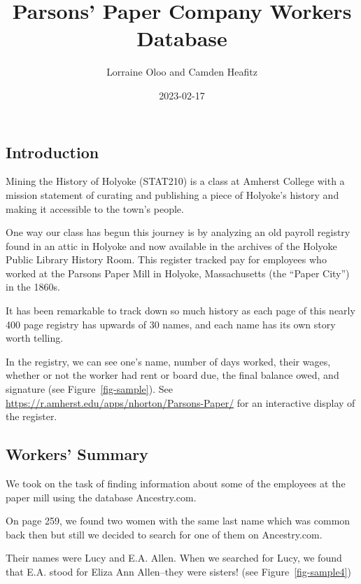 \documentclass[
  letterpaper,
  DIV=11,
  numbers=noendperiod]{scrartcl}
\title{Parsons' Paper Company Workers Database}
\author{Lorraine Oloo and Camden Heafitz}
\date{2023-02-17}
\begin{document}
\maketitle
\ifdefined\Shaded\renewenvironment{Shaded}{\begin{tcolorbox}[boxrule=0pt, frame hidden, sharp corners, borderline west={3pt}{0pt}{shadecolor}, enhanced, breakable, interior hidden]}{\end{tcolorbox}}\fi

\hypertarget{introduction}{%
\subsection{Introduction}\label{introduction}}

Mining the History of Holyoke (STAT210) is a class at Amherst College
with a mission statement of curating and publishing a piece of Holyoke's
history and making it accessible to the town's people.

One way our class has begun this journey is by analyzing an old payroll
registry found in an attic in Holyoke and now available in the archives
of the Holyoke Public Library History Room. This register tracked pay
for employees who worked at the Parsons Paper Mill in Holyoke,
Massachusetts (the ``Paper City'') in the 1860s.

It has been remarkable to track down so much history as each page of
this nearly 400 page registry has upwards of 30 names, and each name has
its own story worth telling.

In the registry, we can see one's name, number of days worked, their
wages, whether or not the worker had rent or board due, the final
balance owed, and signature (see Figure~\ref{fig-sample}). See
\url{https://r.amherst.edu/apps/nhorton/Parsons-Paper/} for an
interactive display of the register.

\hypertarget{workers-summary}{%
\subsection{Workers' Summary}\label{workers-summary}}

We took on the task of finding information about some of the employees
at the paper mill using the database Ancestry.com.

On page 259, we found two women with the same last name which was common
back then but still we decided to search for one of them on
Ancestry.com.

Their names were Lucy and E.A. Allen. When we searched for Lucy, we
found that E.A. stood for Eliza Ann Allen--they were sisters! (see
Figure~\ref{fig-sample4})
\end{document}
